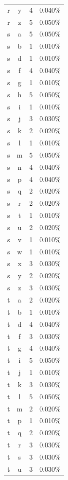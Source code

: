 \begin{longtable}{cccc}
    r & y & 4 & 0.040\% \\
    r & z & 5 & 0.050\% \\
    s & a & 5 & 0.050\% \\
    s & b & 1 & 0.010\% \\
    s & d & 1 & 0.010\% \\
    s & f & 4 & 0.040\% \\
    s & g & 1 & 0.010\% \\
    s & h & 5 & 0.050\% \\
    s & i & 1 & 0.010\% \\
    s & j & 3 & 0.030\% \\
    s & k & 2 & 0.020\% \\
    s & l & 1 & 0.010\% \\
    s & m & 5 & 0.050\% \\
    s & n & 4 & 0.040\% \\
    s & p & 4 & 0.040\% \\
    s & q & 2 & 0.020\% \\
    s & r & 2 & 0.020\% \\
    s & t & 1 & 0.010\% \\
    s & u & 2 & 0.020\% \\
    s & v & 1 & 0.010\% \\
    s & w & 1 & 0.010\% \\
    s & x & 3 & 0.030\% \\
    s & y & 2 & 0.020\% \\
    s & z & 3 & 0.030\% \\
    t & a & 2 & 0.020\% \\
    t & b & 1 & 0.010\% \\
    t & d & 4 & 0.040\% \\
    t & f & 3 & 0.030\% \\
    t & g & 4 & 0.040\% \\
    t & i & 5 & 0.050\% \\
    t & j & 1 & 0.010\% \\
    t & k & 3 & 0.030\% \\
    t & l & 5 & 0.050\% \\
    t & m & 2 & 0.020\% \\
    t & p & 1 & 0.010\% \\
    t & q & 2 & 0.020\% \\
    t & r & 3 & 0.030\% \\
    t & s & 3 & 0.030\% \\
    t & u & 3 & 0.030\% \\

\end{longtable}

